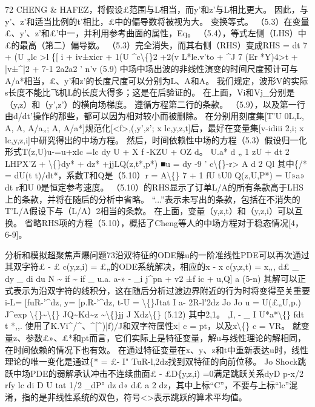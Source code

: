 \documentclass[UTF8,11pt,a4paper,openany,fontset=fandol]{ctexbook}
\begin{document}
72 CHENG \& HAFEZ，将假设£范围与L相当，而y'和z'与L相比更大。 因此，与y'、z'和适当比例的t'相比，£中的偏导数将被视为大。 变换等式。 （5.3）在变量£、y'、z'和£'中一，并利用参考曲面的属性，Eq。 （5.4），等式左侧（LHS）中£的最高（第二）偏导数。 （5.3）完全消失，而其右侧（RHS）变成RHS = dt 7 + (U „lc >l \{[ i + iv±xicr + 1(U \textasciicircum{}c\textbackslash\{\}2 +2(v L*le.v'to + \textasciicircum{}J 7 (Er *Y)4>t + |v±\textasciicircum{}|2 + 7-1 2a2a2 ' n'v (5.9) 中场中场出波的非线性演变的时间尺度预计可与A/a*相当，£、y'和z'的长度尺度可以分别为L、A和A。 我们规定，波形V的实际s长度不能比飞机L的长度大得多；这是在后验证的。 在上面，Vi和Vj\_分别是（y,z）和（y',z'）的横向场梯度。 遵循方程第二行的条款。 （5.9），以及第一行由d/dt'操作的那些，都可以因为相对较小而被删除。 在分别用刻度集[T'U 0L,L, A, A, A/a„; A, A/a*]规范化[<f>,(,y',z'; x lc,y,z,t]后，最好在变量集[v-idiii 2,i; x lc,y,z,i]中研究得出的中场方程。 然后，时间依赖性中场的方程（5.3）假设归一化形式T(z,U)u-=u+xlc =lc dy U + X f -KZU + OZ d。 U.a* d „ 1 zU + dt 2 LHPX'Z + \textbackslash\{\}dy* + dz* +jjLQ(z,t*,p*) ■u = dy -9 ' c\textbackslash\{\}-r> A d 2 Ql 其中\{/* = dU(t t)/dt*，系数T和Q是（5.10）r = A\textbackslash\{\} 7 + 1 fU tU0 Q(z,U,P*) = U»a» dt r和U 0是恒定参考速度。 （5.10）的RHS显示了订单L/A的所有条款高于LHS上的条款，并将在随后的分析中省略。 “...”表示未写出的条款，包括在不消失的T'L/A假设下与（L/A）2相当的条款。 在上面，变量（y,z,t）和（y,z,i）可以互换。 省略RHS项的方程（5.10），概括了Cheng等人的中场方程对于稳态情况[4，6-9]。

分析和模拟超聚焦声爆问题73沿双特征的ODE解u的一阶准线性PDE可以再次通过其双字符£ - £ c(y,z,i) = £„的ODE系统解决，相应的x - x c(y,z,t) = x„, d£ \_ dy \_ di du N \textasciitilde{} if \textasciitilde{} if \_ u.a. a-» - \_i j\textasciicircum{}pn + v2 ±f ic + u,Q] a (5-n) 其解可以正式表示为沿双字符的线积分，这在随后分析过渡边界附近的行为时将变得至关重要 i-L= [fuR-'\textasciicircum{}dz, y= [p.R-'\textasciicircum{}dz, t-U = \textbackslash\{\}Jtat I a- 2R-l'2dz Jo Jo u = U(£„U,p.) J\textasciicircum{}exp \textbackslash\{\}\textasciitilde{}\textbackslash\{\} JQ\textasciitilde{}Kd\textasciitilde{}z \textasciitilde{}\textbackslash\{\}jj J Xdz\textbackslash\{\} (5.12) 其中2,1。 ,I, - \_ I U*a*\textbackslash\{\} fdt t *,,. 使用了K.Vi\textasciicircum{}/\textasciicircum{}、\textasciicircum{}[\textasciicircum{})|f)/J和双字符属性x| c = pt，以及x\textbackslash\{\} c = VR。 就变量z、参数£»、£*和pt而言，它们实际上是特征变量，解u与线性理论的解相同，在时间依赖的情况下也有效。 在通过特征变量在x、y、z和t中重新表达u时，线性理论的唯一变化是通过\{* = £- I" TuR-l,2dz找到双特征的向前位移。 Jo Shock跳跃中场PDE的弱解承认冲击不连续曲面£ - £D\{y,z,i) =0满足跳跃关系dyD p-x/2 rfy lc di D U tat 1/2 \_dP° dz d« d£ a 2 dz，其中上标“C”，不要与上标“lc”混淆，指的是非线性系统的双色，符号<>表示跳跃的算术平均值。
\end{document}
